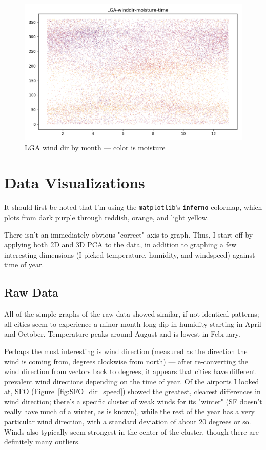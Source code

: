 \documentclass[a4paper]{article}
\begin{document}
\begin{figure}[t]
  \centering
  \includegraphics[width=\linewidth]{../png/basic-vis/LGA-winddir-moisture-time.png}
  \caption{LGA wind dir by month --- color is moisture}
  \label{fig:LGA_dir_moisture}
\end{figure}

\section{Data Visualizations}

It should first be noted that I'm using the \texttt{matplotlib}'s \texttt{\textbf{inferno}} colormap, which plots from dark purple through reddish, orange, and light yellow.

There isn't an immediately obvious "correct" axis to graph. Thus, I start off by applying both 2D and 3D PCA to the data, in addition to graphing a few interesting dimensions (I picked temperature, humidity, and windspeed) against time of year.

\subsection{Raw Data}
All of the simple graphs of the raw data showed similar, if not identical patterns; all cities seem to experience a minor month-long dip in humidity starting in April and October. Temperature peaks around August and is lowest in February. 

Perhaps the most interesting is wind direction (measured as the direction the wind is coming from, degrees clockwise from north) --- after re-converting the wind direction from vectors back to degrees, it appears that cities have different prevalent wind directions depending on the time of year. Of the airports I looked at, SFO (Figure~\ref{fig:SFO_dir_speed}) showed the greatest, clearest differences in wind direction; there's a specific cluster of weak winds for its "winter" (SF doesn't really have much of a winter, as is known), while the rest of the year has a very particular wind direction, with a standard deviation of about 20 degrees or so. Winds also typically seem strongest in the center of the cluster, though there are definitely many outliers. 
\end{document}
